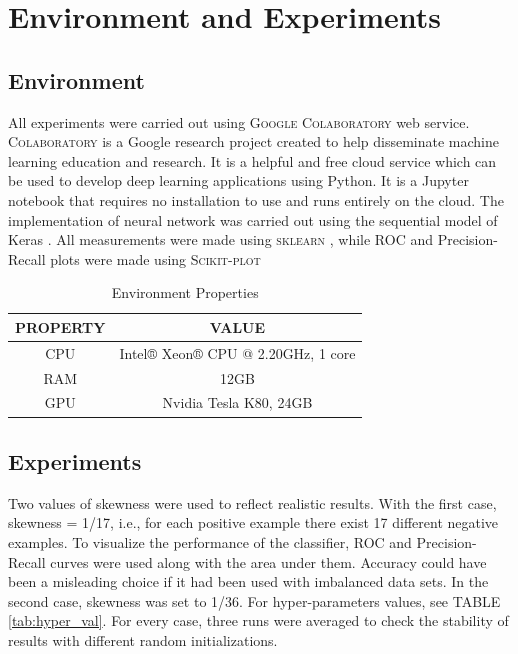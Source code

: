 \documentclass[journal, a4paper]{IEEEtran}
\begin{document}
\section{Environment and Experiments }
\subsection{Environment}
	All experiments were carried out using \textsc{Google Colaboratory} web service. \textsc{Colaboratory} is a Google research project created to help disseminate machine learning education and research. It is a  helpful and free cloud service which can be used to develop deep learning applications using Python. It is a Jupyter notebook that requires no installation to use and runs entirely on the cloud. The implementation of neural network was carried out using the sequential model of Keras \cite{keras}. All measurements were made using \textsc{sklearn} \cite{sklearn}, while ROC and Precision-Recall plots were made using \textsc{Scikit-plot} \cite{scikitplot}
	
	\begin{table}[hbt]
		\begin{center}
		\caption{Environment Properties}
		\label{tab:simParameters}
		\begin{tabular}{|c|c|}
			\hline
			PROPERTY & VALUE \\
			\hline
			CPU & Intel® Xeon® CPU @ 2.20GHz, 1 core \\
			\hline
			RAM & 12GB\\
			\hline
			GPU & Nvidia Tesla K80, 24GB\\
			\hline
		\end{tabular}
		\end{center}
	\end{table}	
\subsection{Experiments}
Two values of skewness were used to reflect realistic results. With the first case, skewness = 1/17, i.e., for each positive example there exist 17 different negative examples. To visualize the performance of the classifier, ROC and Precision-Recall curves were used along with the area under them. Accuracy could have been a misleading choice if it had been used with imbalanced data sets. In the second case, skewness was set to 1/36. For hyper-parameters values, see TABLE \ref{tab:hyper_val}.
For every case, three runs were averaged to check the stability of results with different random initializations.
\end{document}
